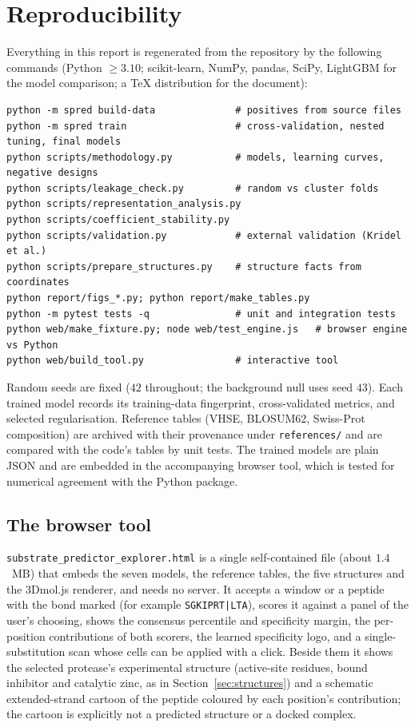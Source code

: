 \section{Reproducibility}
\label{sec:repro}

Everything in this report is regenerated from the repository by the following commands (Python $\ge3.10$; scikit-learn, NumPy, pandas, SciPy, LightGBM for the model comparison; a TeX distribution for the document):
\begin{Verbatim}[fontsize=\small,frame=single,rulecolor=\color{ink!40}]
python -m spred build-data              # positives from source files
python -m spred train                   # cross-validation, nested tuning, final models
python scripts/methodology.py           # models, learning curves, negative designs
python scripts/leakage_check.py         # random vs cluster folds
python scripts/representation_analysis.py
python scripts/coefficient_stability.py
python scripts/validation.py            # external validation (Kridel et al.)
python scripts/prepare_structures.py    # structure facts from coordinates
python report/figs_*.py; python report/make_tables.py
python -m pytest tests -q               # unit and integration tests
python web/make_fixture.py; node web/test_engine.js   # browser engine vs Python
python web/build_tool.py                # interactive tool
\end{Verbatim}
Random seeds are fixed ($42$ throughout; the background null uses seed $43$). Each trained model records its training-data fingerprint, cross-validated metrics, and selected regularisation. Reference tables (VHSE, BLOSUM62, Swiss-Prot composition) are archived with their provenance under \texttt{references/} and are compared with the code's tables by unit tests. The trained models are plain JSON and are embedded in the accompanying browser tool, which is tested for numerical agreement with the Python package.

\subsection*{The browser tool}
\texttt{substrate\_predictor\_explorer.html} is a single self-contained file (about $1.4$~MB) that embeds the seven models, the reference tables, the five structures and the 3Dmol.js renderer, and needs no server. It accepts a window or a peptide with the bond marked (for example \texttt{SGKIPRT|LTA}), scores it against a panel of the user's choosing, shows the consensus percentile and specificity margin, the per-position contributions of both scorers, the learned specificity logo, and a single-substitution scan whose cells can be applied with a click. Beside them it shows the selected protease's experimental structure (active-site residues, bound inhibitor and catalytic zinc, as in Section~\ref{sec:structures}) and a schematic extended-strand cartoon of the peptide coloured by each position's contribution; the cartoon is explicitly not a predicted structure or a docked complex.

